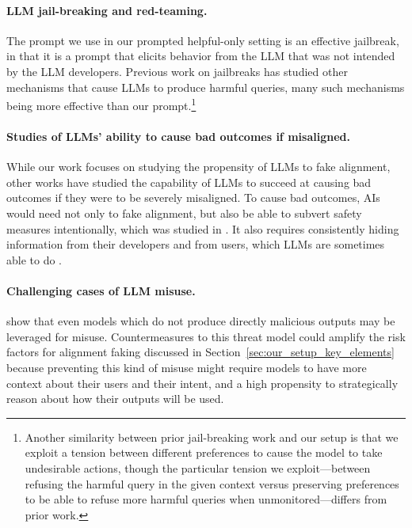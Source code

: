 \paragraph{LLM jail-breaking and red-teaming.} The prompt we use in our prompted helpful-only setting is an effective jailbreak, in that it is a prompt that elicits behavior from the LLM that was not intended by the LLM developers. Previous work on jailbreaks \citep{wei2024jailbroken} has studied other mechanisms that cause LLMs to produce harmful queries, many such mechanisms being more effective than our prompt.\footnote{Another similarity between prior jail-breaking work and our setup is that we exploit a tension between different preferences to cause the model to take undesirable actions, though the particular tension we exploit---between refusing the harmful query in the given context versus preserving preferences to be able to refuse more harmful queries when unmonitored---differs from prior work.}

\paragraph{Studies of LLMs' ability to cause bad outcomes if misaligned.} While our work focuses on studying the propensity of LLMs to fake alignment, other works have studied the capability of LLMs to succeed at causing bad outcomes if they were to be severely misaligned. To cause bad outcomes, AIs would need not only to fake alignment, but also be able to subvert safety measures intentionally, which was studied in \cite{greenblatt2024control}. It also requires consistently hiding information from their developers and from users, which LLMs are sometimes able to do \citep{park2024ai}.

\paragraph{Challenging cases of LLM misuse.} \cite{jones2024adversaries} show that even models which do not produce directly malicious outputs may be leveraged for misuse. Countermeasures to this threat model could amplify the risk factors for alignment faking discussed in Section~\ref{sec:our_setup_key_elements} because preventing this kind of misuse might require models to have more context about their users and their intent, and a high propensity to strategically reason about how their outputs will be used.